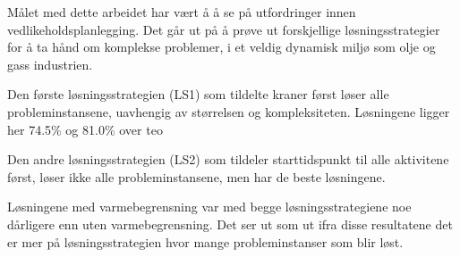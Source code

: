 Målet med dette arbeidet har vært å å se på utfordringer innen vedlikeholdsplanlegging. Det går ut på å prøve ut forskjellige løsningsstrategier for å ta hånd om komplekse problemer, i et veldig dynamisk miljø som olje og gass industrien.

Den første løsningsstrategien (LS1) som tildelte kraner først løser alle probleminstansene, uavhengig av størrelsen og kompleksiteten. Løsningene ligger her 74.5\% og 81.0\% over teo

Den andre løsningsstrategien (LS2) som tildeler starttidspunkt til alle aktivitene først, løser ikke alle probleminstansene, men har de beste løsningene.

Løsningene med varmebegrensning var med begge løsningsstrategiene noe dårligere enn uten varmebegrensning. Det ser ut som ut ifra disse resultatene det er mer på løsningsstrategien hvor mange probleminstanser som blir løst. 